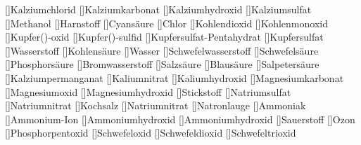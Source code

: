 []{Kalziumchlorid}%
[]{Kalziumkarbonat}%
[]{Kalziumhydroxid}%
[]{Kalziumsulfat}%
[]{Methanol}%
[]{Harnstoff}%
[]{Cyansäure}%
[]{Chlor}%
[]{Kohlendioxid}%
[]{Kohlenmonoxid}%
[]{Kupfer()-oxid}%
[]{Kupfer()-sulfid}%
[]{Kupfersulfat-Pentahydrat}%
[]{Kupfersulfat}%
[]{Wasserstoff}%
[]{Kohlensäure}%
[]{Wasser}%
[]{Schwefelwasserstoff}%
[]{Schwefelsäure}%
[]{Phosphors\"aure}%
[]{Bromwasserstoff}%
[]{Salzs\"aure}%
[]{Blausäure}%
[]{Salpetersäure}%
[]{Kalziumpermanganat}%
[]{Kaliumnitrat}%
[]{Kaliumhydroxid}%
[]{Magnesiumkarbonat}%
[]{Ma\-gne\-sium\-oxid}%
[]{Magnesiumhydroxid}%
[]{Stickstoff}%
[]{Natriumsulfat}%
[]{Natriumnitrat}%
[]{Kochsalz}%
[]{Natriumnitrat}%
[]{Natronlauge}%
[]{Ammoniak}%
[]{Ammonium-Ion}%
[]{Ammoniumhydroxid}%
[]{Ammoniumhydroxid}%
[]{Sauerstoff}%
[]{Ozon}%
[]{Phosphorpentoxid}%
[]{Schwefeloxid}%
[]{Schwefeldioxid}%
[]{Schwefeltrioxid}%
